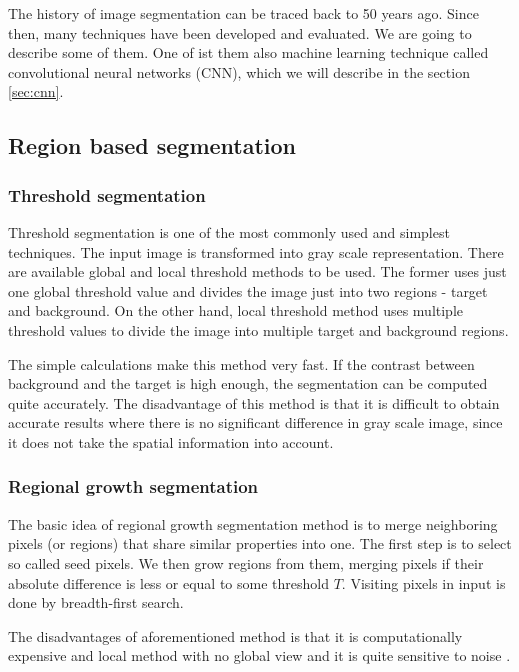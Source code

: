 The history of image segmentation can be traced back to 50 years ago.
Since then, many techniques have been developed and evaluated.
We are going to describe some of them.
One of ist them also machine learning technique called convolutional neural networks
(CNN), which we will describe in the section \ref{sec:cnn}.

\subsection{Region based segmentation}
\label{sec:image_segmentation:region_based}

\subsubsection{Threshold segmentation}
\label{sec:image_segmentation:region_based:threshold}

Threshold segmentation is one of the most commonly used and simplest techniques.
The input image is transformed into gray scale representation. There are available
global and local threshold methods to be used. The former uses just one global threshold
value and divides the image just into two regions - target and background. On the other
hand, local threshold method uses multiple threshold values to divide the image
into multiple target and background regions.

The simple calculations make this method very fast. If the contrast between
background and the target is high enough, the segmentation can be computed quite
accurately. The disadvantage of this method is that it is difficult to obtain
accurate results where there is no significant difference in gray scale image, since
it does not take the spatial information into account. \cite{yuheng2017image}

\subsubsection{Regional growth segmentation}
\label{sec:image_segmentation:region_based:reggrowth}

The basic idea of regional growth segmentation method is to merge neighboring
pixels (or regions) that share similar properties into one. The first step
is to select so called seed pixels. We then grow regions from them, merging pixels
if their absolute difference is less or equal to some threshold $T$.
Visiting pixels in input is done by breadth-first search.

The disadvantages of aforementioned method is that it is computationally expensive
and local method with no global view and it is quite sensitive to noise .

